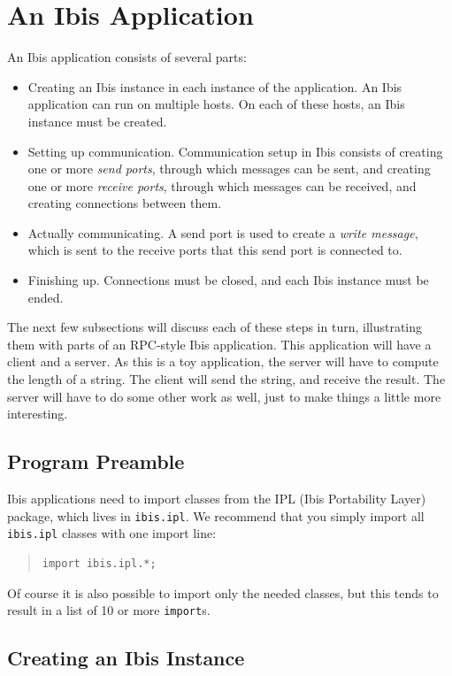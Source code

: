 \documentclass[10pt]{article}
\newcommand{\mysection}[1]{\section{#1}\label{#1}}
\newcommand{\mysubsection}[1]{\subsection{#1}\label{#1}}
\begin{document}
\mysection{An Ibis Application}

An Ibis application consists of several parts:
\begin{itemize}
\item
Creating an Ibis instance in each instance of the application.
An Ibis application can run on multiple hosts.
On each of these hosts, an Ibis instance must be created.
\item
Setting up communication. Communication setup in Ibis
consists of creating one or more \emph{send ports}, through which messages
can be sent, and creating one or more \emph{receive ports},
through which messages can be received, and creating connections between them.
\item
Actually communicating. A send port is used to create a 
\emph{write message}, which is sent to the receive ports that this send port
is connected to.
\item
Finishing up. Connections must be closed, and each Ibis instance must
be ended.
\end{itemize}
\noindent
The next few subsections will discuss each of these steps in turn,
illustrating them with parts of an RPC-style Ibis application.
This application will have a client and a server. As this is a toy
application, the server will have to compute the length of a string.
The client will send the string, and receive the result.
The server will have to do some other work as well, just to make
things a little more interesting.

\subsection{Program Preamble}

Ibis applications need to import classes from the IPL (Ibis
Portability Layer) package, which lives in
\texttt{ibis.ipl}.
We recommend that you simply import all \texttt{ibis.ipl} classes with
one import line:

\begin{quote}
\begin{verbatim}
import ibis.ipl.*;
\end{verbatim}
\end{quote}

\noindent
Of course it is also possible to import only the needed classes, but
this tends to result in a list of 10 or more \texttt{import}s.

\mysubsection{Creating an Ibis Instance}
\end{document}
